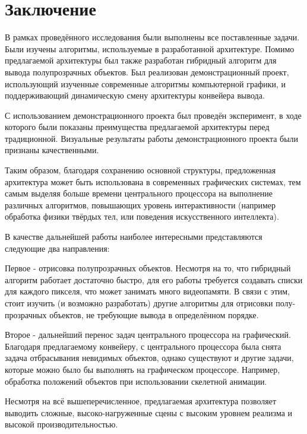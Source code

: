\chapter*{Заключение} \label{ch-conclusion}
	В рамках проведённого исследования были выполнены все поставленные задачи. Были изучены алгоритмы, используемые в разработанной архитектуре. Помимо предлагаемой архитектуры был также разработан гибридный алгоритм для вывода полупрозрачных объектов. Был реализован демонстрационный проект, использующий изученные современные алгоритмы компьютерной графики, и поддерживающий динамическую смену архитектуры конвейера вывода.
	
	С использованием демонстрационного проекта был проведён эксперимент, в ходе которого были показаны преимущества предлагаемой архитектуры перед традиционной. Визуальные результаты работы демонстрационного проекта были признаны качественными.
	
	Таким образом, благодаря сохранению основной структуры, предложенная архитектура может быть использована в современных графических системах, тем самым выделяя больше времени центрального процессора на выполнение различных алгоритмов, повышающих уровень интерактивности (например обработка физики твёрдых тел, или поведения искусственного интеллекта).
	
	В качестве дальнейшей работы наиболее интересными представляются следующие два направления:
	
	Первое - отрисовка полупрозрачных объектов. Несмотря на то, что гибридный алгоритм работает достаточно быстро, для его работы требуется создавать списки для каждого пикселя, что может занимать много видеопамяти. В связи с этим, стоит изучить (и возможно разработать) другие алгоритмы для отрисовки полу-прозрачных объектов, не требующие вывода в определённом порядке.

	Второе - дальнейший перенос задач центрального процессора на графический. Благодаря предлагаемому конвейеру, с центрального процессора была снята задача отбрасывания невидимых объектов, однако существуют и другие задачи, которые можно было бы выполнять на графическом процессоре. Например, обработка положений объектов при использовании скелетной анимации.
	
	Несмотря на всё вышеперечисленное, предлагаемая архитектура позволяет выводить сложные, высоко-нагруженные сцены с высоким уровнем реализма и высокой производительностью.